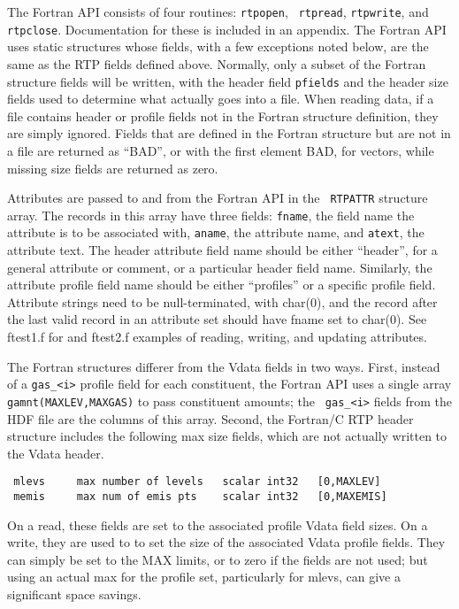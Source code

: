 \documentclass[11pt]{article}
\begin{document}
The Fortran API consists of four routines: {\tt rtpopen}, {\tt
rtpread}, {\tt rtpwrite}, and {\tt rtpclose}.  Documentation for
these is included in an appendix.  The Fortran API uses static
structures whose fields, with a few exceptions noted below, are the
same as the RTP fields defined above.  Normally, only a subset of
the Fortran structure fields will be written, with the header field
{\tt pfields} and the header size fields used to determine what
actually goes into a file.  When reading data, if a file contains
header or profile fields not in the Fortran structure definition,
they are simply ignored.  Fields that are defined in the Fortran
structure but are not in a file are returned as ``BAD'', or with the
first element BAD, for vectors, while missing size fields are
returned as zero.

Attributes are passed to and from the Fortran API in the {\tt
RTPATTR} structure array.  The records in this array have three
fields: {\tt fname}, the field name the attribute is to be
associated with, {\tt aname}, the attribute name, and {\tt atext},
the attribute text.  The header attribute field name should be
either ``header'', for a general attribute or comment, or a
particular header field name.  Similarly, the attribute profile
field name should be either ``profiles'' or a specific profile
field.  Attribute strings need to be null-terminated, with char(0),
and the record after the last valid record in an attribute set
should have fname set to char(0).  See ftest1.f for and ftest2.f
examples of reading, writing, and updating attributes.

The Fortran structures differer from the Vdata fields in two ways.
First, instead of a {\tt gas\_<i>} profile field for each
constituent, the Fortran API uses a single array {\tt
gamnt(MAXLEV,MAXGAS)} to pass constituent amounts; the {\tt
gas\_<i>} fields from the HDF file are the columns of this array.
Second, the Fortran/C RTP header structure includes the following
max size fields, which are not actually written to the Vdata header.

{\small
\begin{verbatim}
 mlevs     max number of levels   scalar int32   [0,MAXLEV]
 memis     max num of emis pts    scalar int32   [0,MAXEMIS]
\end{verbatim}
}

On a read, these fields are set to the associated profile Vdata
field sizes.  On a write, they are used to to set the size of the
associated Vdata profile fields.  They can simply be set to the MAX
limits, or to zero if the fields are not used; but using an actual
max for the profile set, particularly for mlevs, can give a
significant space savings.
\end{document}
